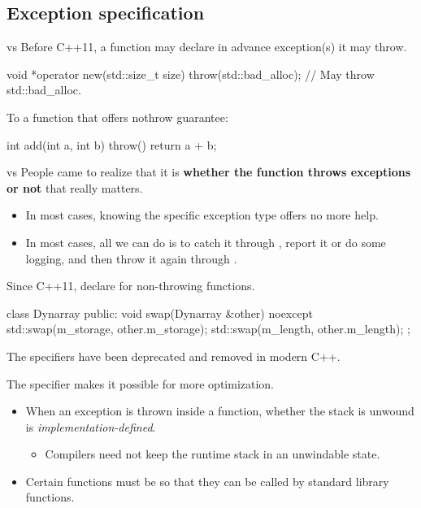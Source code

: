 \documentclass[aspectratio=169]{beamer}
\begin{document}
\subsection{Exception specification}

\begin{frame}[fragile]{ vs }
  Before C++11, a function may declare in advance  exception(s) it may throw.
  \begin{cpp}
void *operator new(std::size_t size) throw(std::bad_alloc); // May throw std::bad_alloc.
  \end{cpp}
  \pause
  To a function that offers nothrow guarantee: 
  \begin{cpp}
int add(int a, int b) throw() {
  return a + b;
}
  \end{cpp}
\end{frame}

\begin{frame}[fragile]{ vs }
  People came to realize that it is \textbf{whether the function throws exceptions or not} that really matters.
  \begin{itemize}
    \item In most cases, knowing the specific exception type offers no more help.
    \item In most cases, all we can do is to catch it through , report it or do some logging, and then throw it again through .
  \end{itemize}
  \pause
  Since C++11, declare  for non-throwing functions.
  \begin{cpp}
    class Dynarray {
    public:
      void swap(Dynarray &other) noexcept {
        std::swap(m_storage, other.m_storage);
        std::swap(m_length, other.m_length);
      }
    };
  \end{cpp}
  The  specifiers have been deprecated and removed in modern C++.
\end{frame}

\begin{frame}{}
  The  specifier makes it possible for more optimization.
  \begin{itemize}
    \item When an exception is thrown inside a  function, whether the stack is unwound is \textit{implementation-defined}.
    \begin{itemize}
      \item Compilers need not keep the runtime stack in an unwindable state.
    \end{itemize}
    \item Certain functions must be  so that they can be called by standard library functions.
  \end{itemize}
\end{frame}
\end{document}
